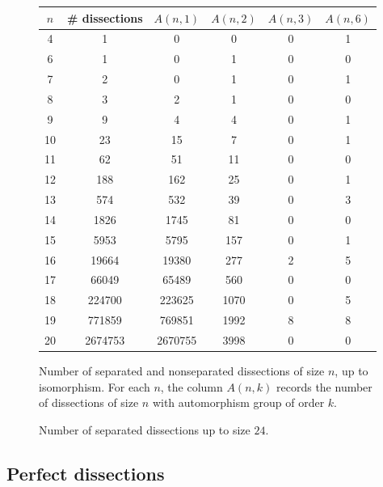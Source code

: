 \documentclass[12pt,amstags,fleqn]{article}
\theoremstyle{plain}
\theoremstyle{definition}
\begin{document}
\begin{figure}[htbp]
\begin{center}
\begin{tabular}{|c|c|c|c|c|c|}
\hline $n$ & \# dissections & $A(n,1)$ & $A(n,2)$ & $A(n,3)$ & $A(n,6)$ \\
\hline
\hline 4  & 1 & 0 & 0 & 0 & 1 \\
\hline 6  & 1 & 0 & 1 & 0 & 0 \\
\hline 7  & 2 & 0 & 1 & 0 & 1 \\
\hline 8  & 3 & 2 & 1 & 0 & 0 \\
\hline 9  & 9 & 4 & 4 & 0 & 1 \\
\hline 10 & 23 & 15 & 7 & 0 & 1 \\
\hline 11 & 62 & 51 & 11 & 0 & 0 \\
\hline 12 & 188 & 162 & 25 & 0 & 1 \\
\hline 13 & 574 & 532 & 39 & 0 & 3 \\
\hline 14 & 1826 & 1745 & 81 & 0 & 0 \\
\hline 15 & 5953 & 5795 & 157 & 0 & 1 \\
\hline 16 & 19664 & 19380 & 277 & 2 & 5 \\
\hline 17 & 66049 & 65489 & 560 & 0 & 0 \\
\hline 18 & 224700 & 223625 & 1070 & 0 & 5 \\
\hline 19 & 771859 & 769851 & 1992 & 8 & 8 \\
\hline 20 & 2674753 & 2670755 & 3998 & 0 & 0 \\
\hline
\end{tabular}
\end{center}
\caption{Number of separated and nonseparated dissections of size $n$, up to isomorphism.
For each $n$, the column $A(n,k)$
records the number of dissections of size $n$ with
automorphism group of order $k$.}
\label{figCountSeparatedAndNonseparated}
\end{figure}
%

\begin{figure}[htbp]
\begin{center}
\end{center}
\caption{Number of separated dissections up to size $24$.}
\label{logSignatureCounts}
\end{figure}



\subsection{Perfect dissections}
\end{document}
